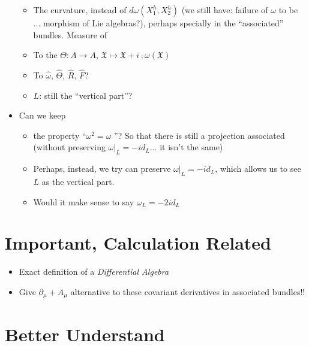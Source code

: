 \begin{itemize}
\begin{itemize}
        \item The curvature, instead of $d\omega(X_1^h, X_2^h)$ (we still have: failure of $\omega$ to be ... morphism of Lie algebras?), perhaps specially in the ``associated'' bundles. Measure of 
        
        \item To the $\Theta:A \to A$, $\mathfrak X \mapsto \mathfrak X + i \comp \omega(\mathfrak X)$ 
        
        \item To $\hat \omega$, $\hat \Theta$, $\hat R$, $\hat F$?
        
        \item $L$: still the ``vertical part''?
    \end{itemize}
    
    \item Can we keep
    \begin{itemize}
        \item the property ``$\omega^2 = \omega$ ''? So that there is still a projection associated (without preserving $\omega |_L = -id_L$... it isn't the same)
        
        \item Perhaps, instead, we try can preserve $\omega |_L = -id_L$, which allows us to see $L$ as the vertical part.
        
        \item Would it make sense to say $\omega_L = -2id_L$
    \end{itemize}
\end{itemize}

\section{Important, Calculation Related}

\begin{itemize}
    \item Exact definition of a \emph{Differential Algebra}
    
    \item Give $\partial_\mu + A_\mu$ alternative to these covariant derivatives in associated bundles!!
\end{itemize}

\section{Better Understand}

